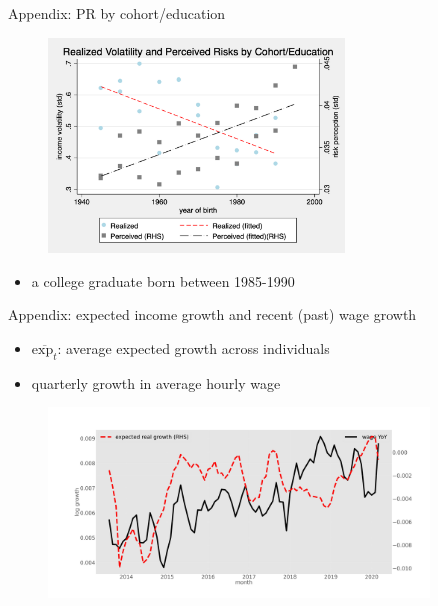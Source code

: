 \documentclass{beamer}
\begin{document}
\begin{frame}{Appendix: PR by cohort/education}
	\begin{figure}[ht]
		\label{appendix2:cohort_edu_compare_figure}
		\centering
		\includegraphics[width=0.7\textwidth]{figures/real_log_wage_shk_gr_by_byear_5yr_edu_compare.png}
	\end{figure}
	\begin{itemize}
		\item a college graduate born between 1985-1990  \quad  \hyperlink{cohort_compare}{} 
	\end{itemize}
\end{frame}



\begin{frame}{Appendix: expected income growth and recent (past) wage growth}
	\label{appendix:tsMean3mvrexp_he}
	\begin{itemize}
		\item $\overline{\text{exp}_{t}} $: average expected growth across individuals
		\item  quarterly growth in average hourly wage
	\end{itemize}
	\begin{figure}
		\centering
		\label{ts_exp}
		\includegraphics[width=0.9\textwidth]{figures/tsMean3mvrexp_he.jpg}
	\end{figure}
	\quad  \hyperlink{tsMean3mvrvar_he}{} 
\end{frame}
\end{document}
